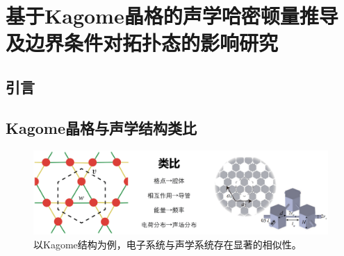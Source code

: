 \chapter{基于Kagome晶格的声学哈密顿量推导及边界条件对拓扑态的影响研究}

\section{引言}

\section{Kagome晶格与声学结构类比}

\begin{figure}[h!]
  \centering
  \includegraphics[width=1\textwidth]{images/fig3-1.eps} 
  \caption{以Kagome结构为例，电子系统与声学系统存在显著的相似性。}
  \label{fig_3_1}
\end{figure}

